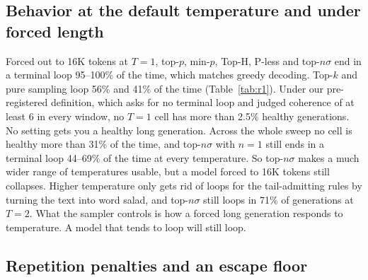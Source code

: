 \documentclass{article}
\newcommand{\pless}{P-less}
\begin{document}
\subsection{Behavior at the default temperature and under forced length}
Forced out to 16K tokens at $T{=}1$, top-$p$, min-$p$, Top-H, \pless{} and top-$n\sigma$ end in a terminal loop 95--100\% of the time, which matches greedy decoding. Top-$k$ and pure sampling loop 56\% and 41\% of the time (Table~\ref{tab:r1}). Under our pre-registered definition, which asks for no terminal loop and judged coherence of at least 6 in every window, no $T{=}1$ cell has more than 2.5\% healthy generations. No setting gets you a healthy long generation. Across the whole sweep no cell is healthy more than 31\% of the time, and top-$n\sigma$ with $n{=}1$ still ends in a terminal loop 44--69\% of the time at every temperature. So top-$n\sigma$ makes a much wider range of temperatures usable, but a model forced to 16K tokens still collapses. Higher temperature only gets rid of loops for the tail-admitting rules by turning the text into word salad, and top-$n\sigma$ still loops in 71\% of generations at $T{=}2$. What the sampler controls is how a forced long generation responds to temperature. A model that tends to loop will still loop.

\subsection{Repetition penalties and an escape floor}
\label{sec:stack}
\end{document}
